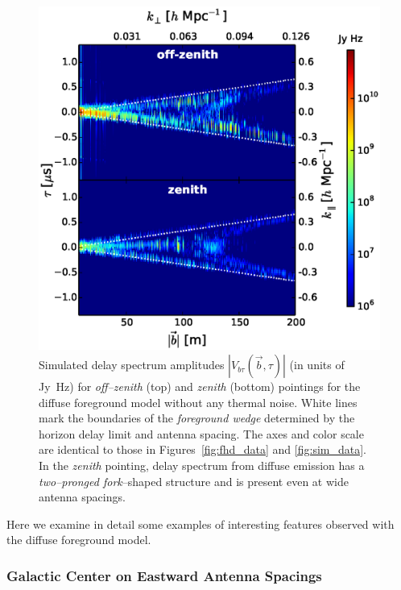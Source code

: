 \documentclass[preprint2,iop,numberedappendix]{emulateapj}
\begin{document}
\begin{figure}[htb]
\centering
\includegraphics[width=\linewidth]{figures/v1_0/delta_array_multi_baseline_CLEAN_noiseless_visibilities_0.3m_ground_custom_gaussian_FG_model_dsm_all_sky_nside_64_Tsys_95.0K_185.0_MHz_30.7_MHz_bhw2.0.eps}
\caption{Simulated delay spectrum amplitudes $|V_{b\tau}(\vec{b},\tau)|$ (in units of Jy~Hz) for {\it off--zenith} (top) and {\it zenith} (bottom) pointings for the diffuse foreground model without any thermal noise. White lines mark the boundaries of the {\it foreground wedge} determined by the horizon delay limit and antenna spacing. The axes and color scale are identical to those in Figures~\ref{fig:fhd_data} and \ref{fig:sim_data}. In the {\it zenith} pointing, delay spectrum from diffuse emission has a {\it two--pronged fork}--shaped structure and is present even at wide antenna spacings. \label{fig:noiseless-dsm-delay-spectrum}}
\end{figure}

Here we examine in detail some examples of interesting features observed with the diffuse foreground model.

\subsubsection{Galactic Center on Eastward Antenna Spacings}\label{sec:GC-east}
\end{document}
